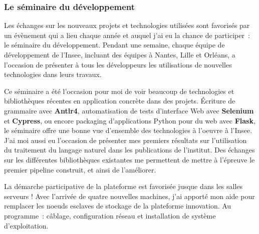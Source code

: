 \subsubsection*{Le séminaire du développement}
Les échanges sur les nouveaux projets et technologies utilisées sont favorisés par un évènement qui a lieu chaque année et auquel j'ai eu la chance de participer~: le séminaire du développement. Pendant une semaine, chaque équipe de développement de l'Insee, incluant des équipes à Nantes, Lille et Orléans, a l'occasion de présenter à tous les développeurs les utilisations de nouvelles technologies dans leurs travaux.
\newline


Ce séminaire a été l'occasion pour moi de voir beaucoup de technologies et bibliothèques récentes en application concrète dans des projets. Écriture de grammaire avec \textbf{Antlr4}, automatisation de tests d'interface Web avec \textbf{Selenium} et \textbf{Cypress}, ou encore packaging d'applications Python pour du web avec \textbf{Flask}, le séminaire offre une bonne vue d'ensemble des technologies à l'oeuvre à l'Insee. J'ai moi aussi eu l'occasion de présenter mes premiers résultats sur l'utilisation du traitement du langage naturel dans les publications de l'institut. Des échanges sur les différentes bibliothèques existantes me permettent de mettre à l'épreuve le premier pipeline construit, et ainsi de l'améliorer.
\newline

La démarche participative de la plateforme est favorisée jusque dans les salles serveurs ! Avec l'arrivée de quatre nouvelles machines, j'ai apporté mon aide pour remplacer les noeuds esclaves de stockage de la plateforme innovation. Au programme~: câblage, configuration réseau et installation de système d'exploitation. 

